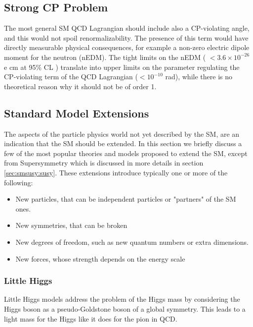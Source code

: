 \subsection*{Strong CP Problem}

The most general SM QCD Lagrangian should include also a CP-violating angle, and this would not spoil renormalizability. The presence of this term would have directly measurable physical consequences, for example a non-zero electric dipole moment for the neutron (nEDM). The tight  limits on the nEDM ( $< 3.6 \times 10^{-26}$ e cm at 95\% CL \cite{PhysRevD.92.092003}) translate into upper limits on the parameter regulating the CP-violating term of the QCD Lagrangian ($< 10^{-10}$ rad), while there is no theoretical reason why it should not be of order 1. 


\subsection{Standard Model Extensions}
\label{sec:sm:extensions}

The aspects of the particle physics world not yet described by the SM, are an indication that the SM should be extended.
In this section we briefly discuss a few of the most popular theories and models proposed to extend the SM, except from Supersymmetry which is discussed in more details in section \ref{sec:smsusy:susy}. These extensions introduce typically one or more of the following:

\begin{itemize}
\item New particles, that can be independent particles or "partners" of the SM ones.
\item New symmetries, that can be broken 
\item New degrees of freedom, such as new quantum numbers or extra dimensions.
\item New forces, whose strength depends on the energy scale
\end{itemize}

\subsubsection*{Little Higgs}
Little Higgs models address the problem of the Higgs mass by considering the Higgs boson as a pseudo-Goldstone boson of a global symmetry. This leads to a light mass for the Higgs like it does for the pion in QCD.

